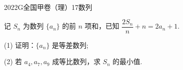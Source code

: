 
\begin{problem}{2022}{G}{全国甲卷（理）}{17}{数列}

记 $S_n$ 为数列 $\{a_n\}$ 的前 $n$ 项和，已知 $\dfrac{2S_n}{n}+n=2a_n+1$.

(1) 证明：$\{a_n\}$ 是等差数列;

(2) 若 $a_4, a_7, a_9$ 成等比数列，求 $S_n$ 的最小值.

\end{problem}